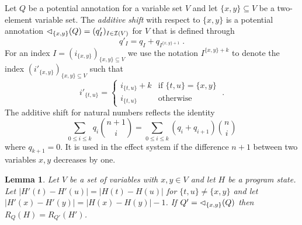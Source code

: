 \documentclass[nocopyrightspace,preprint]{sigplanconf-pldi15}
\newtheorem{lemma}{Lemma}
\begin{document}
Let $Q$ be a potential annotation for a variable set $V$ and let
$\{x,y\} \subseteq V$ be a two-element variable set.  The
\emph{additive shift} with respect to $\{x,y\}$ is a potential
annotation ${\lhd}_{\{x,y\}}(Q) = (q'_I)_{I \in \mathcal{I}(V)} $ for $V$
that is defined through
$$
q'_I = q_I + q_{I^{\{x,y\}{+}1}} \; .
$$
For an index $I = (i_{\{x,y\}})_{\{x,y\} \subseteq V}$ we use the
notation $I^{\{x,y\}{+}k}$ to denote the index
$(i'_{\{x,y\}})_{\{x,y\} \subseteq V}$ such that
$$
i'_{\{t,u\}} = \left\{
  \begin{array}{ll}
    i_{\{t,u\}} + k  & \text{if } \{t,u\} = \{x,y\} \\
    i_{\{t,u\}} & \text{otherwise}
  \end{array}
\right.
\;.
$$
%
The additive shift for natural numbers reflects the identity
\begin{equation}
\label{eq:shift}
\sum_{0 {\leq} i \leq {k}} q_i \binom{n+1}{i} = \sum_{0 {\leq} i \leq {k}} (q_i{+}q_{i+1}) \binom{n}{i}
\end{equation}
where $q_{k+1} = 0$.  It is used in the effect system if the
difference $n+1$ between two variables $x,y$ decreases by one.

\begin{lemma} Let $V$ be a set of variables with $x,y \in V$ and let
  $H$ be a program state. Let $|H'(t) {-} H'(u)| = |H(t) {-} H(u)|$
  for $\{t,u\} \neq \{x,y\}$ and let $|H'(x) {-} H'(y)| = |H(x) {-}
  H(y)| - 1$.
  If $Q' = {\lhd}_{\{x,y\}}(Q)$ then $R_Q(H) = R_{Q'}(H')$.
\end{lemma}
\end{document}

